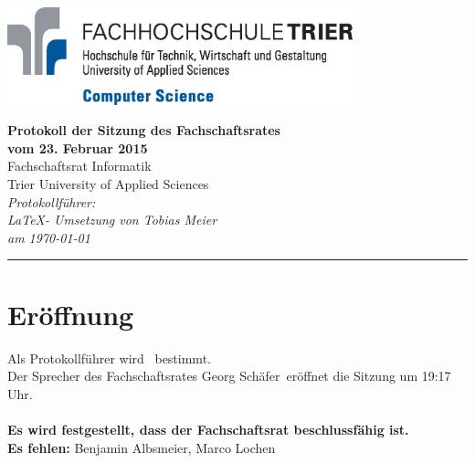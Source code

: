 \documentclass[a4paper, 11pt]{article} %
\newcommand{\protokoller}{}
\newcommand{\dateOfMeeting}{23. Februar 2015}
\newcommand{\TeXer}{Tobias Meier}
\newcommand{\fsiPresident}{Georg Schäfer}
\begin{document}

\doublespacing
\thispagestyle{empty}

\begin{center}
\includegraphics[width=10.0cm]{../logo_faculty_computer_science.eps}

\vspace*{\fill}
{\LARGE \textbf{Protokoll der Sitzung des Fachschaftsrates \\vom \dateOfMeeting}}\\
Fachschaftsrat Informatik\\
Trier University of Applied Sciences\\
\vspace{2.5cm}
\textit{
	Protokollführer: \textbf{\protokoller} \\
	\LaTeX - Umsetzung von \TeXer\\
	am \today
}
\vfill
\end{center}

\hspace*{-35cm}
\textcolor{fsi}{\rule{64.9cm}{15pt}}
\pagebreak
 
\setcounter{tocdepth}{2}
\tableofcontents 
\pagebreak

\section{Eröffnung}
Als Protokollführer wird \protokoller~bestimmt.\\
Der Sprecher des Fachschaftsrates \fsiPresident~eröffnet die Sitzung um 19:17 Uhr.
\\\\
\textbf{Es wird festgestellt, dass der Fachschaftsrat beschlussfähig ist.}\\
\textbf{Es fehlen:} Benjamin Albsmeier, Marco Lochen 
\end{document}
